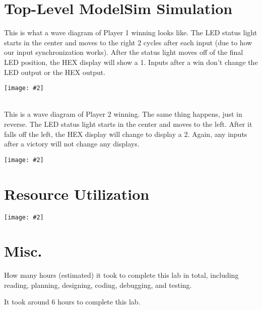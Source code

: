 \documentclass{article}
\newenvironment{solution}{\begin{mdframed}[style=SolutionFrame]}{\end{mdframed}}
\newcommand{\img}[2][0.9]{
    \begin{minipage}[t]{0.9\linewidth}
        \begin{center}
            \texttt{[image: \#2]}
        \end{center}
    \end{minipage}
}
\begin{document}
\section{Top-Level ModelSim Simulation}
    \begin{solution}
        This is what a wave diagram of Player 1 winning looks like. The LED status light starts in the center and moves to the right 2 cycles after each input (due to how our input synchronization works). After the status light moves off of the final LED position, the HEX display will show a 1. Inputs after a win don't change the LED output or the HEX output. \\
        \img{player1.png} \\
        This is a wave diagram of Player 2 winning. The same thing happens, just in reverse. The LED status light starts in the center and moves to the left. After it falls off the left, the HEX display will change to display a 2. Again, any inputs after a victory will not change any displays.  \\
        \img{player2.png}
    \end{solution}

\newpage
\section{Resource Utilization}
    \begin{solution}
        \img{resources.png}
    \end{solution}

\section{Misc.}
    How many hours (estimated) it took to complete this lab in total, including reading, planning, designing, coding, debugging, and testing.
    \begin{solution}
        It took around 6 hours to complete this lab.
    \end{solution}
\end{document}
